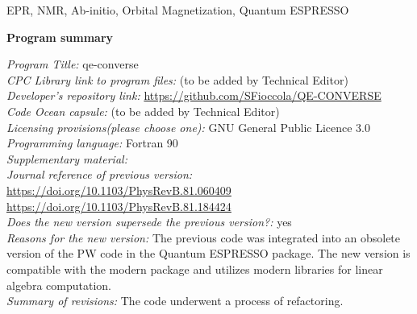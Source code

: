 \documentclass[final,3p,times,twocolumn]{elsarticle}
\begin{document}
\begin{frontmatter}
\begin{abstract}
\end{abstract}

\begin{keyword}
EPR, NMR, Ab-initio, Orbital Magnetization, Quantum ESPRESSO

\end{keyword}

\end{frontmatter}



{\bf Program summary}

\begin{small}
\noindent
{\em Program Title:} qe-converse                                       \\
{\em CPC Library link to program files:} (to be added by Technical Editor) \\
{\em Developer's repository link:} \url{https://github.com/SFioccola/QE-CONVERSE} \\
{\em Code Ocean capsule:} (to be added by Technical Editor)\\
{\em Licensing provisions(please choose one):} GNU General Public Licence 3.0  \\
{\em Programming language:}     Fortran 90                              \\
{\em Supplementary material:}                                 \\
{\em Journal reference of previous version:} \\ \url{https://doi.org/10.1103/PhysRevB.81.060409} \\
\url{https://doi.org/10.1103/PhysRevB.81.184424}\\
{\em Does the new version supersede the previous version?:} yes   \\
{\em Reasons for the new version:} The previous code was integrated into an obsolete version of the PW code in the Quantum ESPRESSO package. The new version is compatible with the modern package and utilizes modern libraries for linear algebra computation.  \\
{\em Summary of revisions:} The code underwent a process of refactoring. \\

\end{small}
\end{document}

